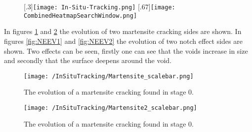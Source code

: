 \begin{figure}
\centering
\subcaptionbox{}%
  [.3\linewidth]{\texttt{[image: In-Situ-Tracking.png]}}
\centering
\subcaptionbox{}
  [.67\linewidth]{\texttt{[image: CombinedHeatmapSearchWindow.png]}}
\end{figure}


In figures \ref{fig:MCEV1} and \ref{fig:MCEV2} the evolution of two martensite cracking sides are shown. In figures \ref{fig:NEEV1} and \ref{fig:NEEV2} the evolution of two notch effect sides are shown. Two effects can be seen, firstly one can see that the voids increase in size and secondly that the surface deepens around the void. \\

\begin{figure}
\texttt{[image: /InSituTracking/Martensite\_scalebar.png]}
\caption{The evolution of a martensite cracking found in stage 0.}
\label{fig:MCEV1}
\end{figure}

\begin{figure}
\texttt{[image: /InSituTracking/Martensite2\_scalebar.png]}
\caption{The evolution of a martensite cracking found in stage 0.}
\label{fig:MCEV2}
\end{figure}



